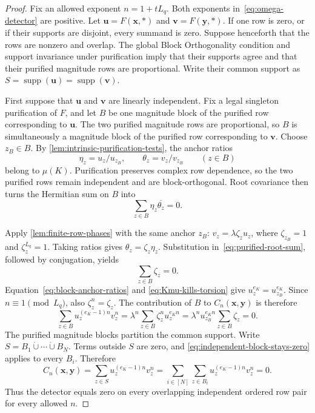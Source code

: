 \documentclass[11pt,letterpaper,onecolumn]{article}
\theoremstyle{plain}
\theoremstyle{definition}
\theoremstyle{remark}
\DeclareMathOperator{\supp}{supp}
\begin{document}
\begin{proof}
Fix an allowed exponent $n=1+tL_q$.  Both exponents
in~\eqref{eq:omega-detector} are positive.  Let
$\mathbf u=F(\mathbf x,\ast)$ and $\mathbf v=F(\mathbf y,\ast)$.  If one row
is zero, or if their supports are disjoint, every summand is zero.
Suppose henceforth that the rows are nonzero and overlap.  The global Block
Orthogonality condition and support invariance under purification imply that their
supports agree and that their purified magnitude rows are proportional.
Write their common support as $S=\supp(\mathbf u)=\supp(\mathbf v)$.

First suppose that $\mathbf u$ and $\mathbf v$ are linearly independent.
Fix a legal singleton purification of $F$, and let $B$ be one magnitude block
of the purified row corresponding to $\mathbf u$.  The two purified
magnitude rows are proportional, so $B$ is simultaneously a magnitude block
of the purified row corresponding to $\mathbf v$.  Choose $z_B\in B$.  By
\cref{lem:intrinsic-purification-tests}, the anchor ratios
\begin{equation}
  \eta_z=u_z/u_{z_B},
  \qquad
  \theta_z=v_z/v_{z_B}
  \qquad(z\in B)
  \label{eq:block-anchor-ratios}
\end{equation}
belong to $\mu(K)$.  Purification preserves complex row dependence, so the
two purified rows remain independent and are block-orthogonal.  Root
covariance then turns the Hermitian sum on $B$ into
\begin{equation}
  \sum_{z\in B}\eta_z\overline{\theta_z}=0.
  \label{eq:purified-root-sum}
\end{equation}

Apply \cref{lem:finite-row-phases} with the same anchor $z_B$:
$v_z=\lambda\zeta_z u_z$, where $\zeta_{z_B}=1$ and
$\zeta_z^{L_q}=1$.  Taking ratios gives $\theta_z=\zeta_z\eta_z$.
Substitution in~\eqref{eq:purified-root-sum}, followed by conjugation, yields
\begin{equation*}
  \sum_{z\in B}\zeta_z=0.
\end{equation*}
Equation~\eqref{eq:block-anchor-ratios} and
\eqref{eq:Kmu-kills-torsion} give
$u_z^{e_K}=u_{z_B}^{e_K}$.  Since $n\equiv1\pmod{L_q}$, also
$\zeta_z^n=\zeta_z$.  The contribution of $B$ to
$C_n(\mathbf x,\mathbf y)$ is therefore
\begin{equation}
  \sum_{z\in B}u_z^{(e_K-1)n}v_z^n
  =\lambda^n\sum_{z\in B}\zeta_z^n u_z^{e_K n}
  =\lambda^n u_{z_B}^{e_K n}\sum_{z\in B}\zeta_z=0.
  \label{eq:independent-block-stays-zero}
\end{equation}
The purified magnitude blocks partition the common support. Write $S=B_1\mathbin{\dot\cup}\cdots\mathbin{\dot\cup}B_N$. Terms outside $S$ are zero, and
\eqref{eq:independent-block-stays-zero} applies to every $B_i$.  Therefore
\begin{equation*}
  C_n(\mathbf x,\mathbf y)
  =\sum_{z\in S}u_z^{(e_K-1)n}v_z^n
  =\sum_{i\in[N]}\sum_{z\in B_i}u_z^{(e_K-1)n}v_z^n=0.
\end{equation*}
Thus the detector equals zero on every overlapping independent ordered row pair
for every allowed $n$.


\end{proof}
\end{document}

